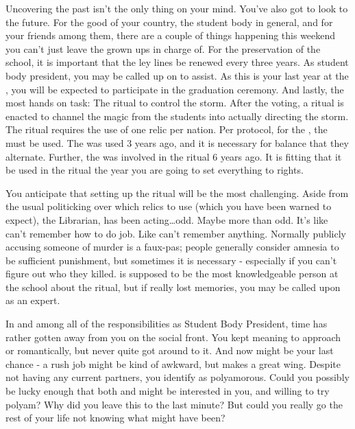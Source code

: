 \documentclass[char]{GL2020}
\begin{document}
Uncovering the past isn't the only thing on your mind. You've also got to look to the future. For the good of your country, the student body in general, and for your friends among them, there are a couple of things happening this weekend you can't just leave the grown ups in charge of. For the preservation of the school, it is important that the ley lines be renewed every three years. As student body president, you may be called up on to assist. As this is your last year at the \pSc{}, you will be expected to participate in the graduation ceremony. And lastly, the most hands on task: The ritual to control the storm. After the voting, a ritual is enacted to channel the magic from the students into actually directing the storm. The ritual requires the use of one relic per nation. Per protocol, for the \pShip{}, the \iNet{} must be used. The \iChalice{} was used 3 years ago, and it is necessary for balance that they alternate. Further, the \iNet{} was involved in the ritual 6 years ago. It is fitting that it be used in the ritual the year you are going to set everything to rights.

You anticipate that setting up the ritual will be the most challenging. Aside from the usual politicking over which relics to use (which you have been warned to expect), the Librarian, \cLibrarian{} has been acting\ldots odd. \cLibrarian{\They} Maybe more than odd. It's like \cLibrarian{\they} can't remember how to do \cLibrarian{\their} job. Like \cLibrarian{\they} can't remember anything. Normally publicly accusing someone of murder is a faux-pas; people generally consider amnesia to be sufficient punishment, but sometimes it is necessary - especially if you can't figure out who they killed. \cLibrarian{} is supposed to be the most knowledgeable person at the school about the ritual, but if \cLibrarian{\they} really \cLibrarian{\have} lost \cLibrarian{\their} memories, you may be called upon as an expert.

In and among all of the responsibilities as Student Body President, time has rather gotten away from you on the social front. You kept meaning to approach \cHeir{} or \cChupStudent{} romantically, but never quite got around to it. And now might be your last chance - a rush job might be kind of awkward, but \cInitiate{} makes a great wing\cInitiate{\person}. Despite not having any current partners, you identify as polyamorous. Could you possibly be lucky enough that both \cHeir{} and \cChupStudent{} might be interested in you, and willing to try polyam? Why did you leave this to the last minute? But could you really go the rest of your life not knowing what might have been?
\end{document}
